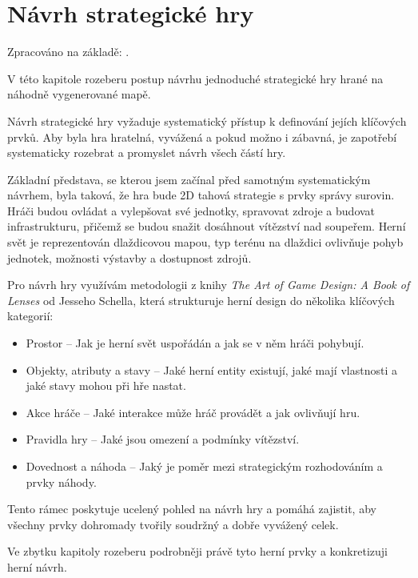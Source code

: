 \section{Návrh strategické hry}

Zpracováno na základě: \cite{navrh_lenses} \cite{navrh_rules} \cite{navrh_level}.

V této kapitole rozeberu postup návrhu jednoduché strategické hry hrané na náhodně vygenerované mapě.

Návrh strategické hry vyžaduje systematický přístup k definování jejích klíčových prvků. Aby byla hra hratelná, vyvážená a pokud možno i zábavná, je zapotřebí systematicky rozebrat a promyslet návrh všech částí hry. 

Základní představa, se kterou jsem začínal před samotným systematickým návrhem, byla taková, že hra bude 2D tahová strategie s prvky správy surovin. Hráči budou ovládat a vylepšovat své jednotky, spravovat zdroje a budovat infrastrukturu, přičemž se budou snažit dosáhnout vítězství nad soupeřem. Herní svět je reprezentován dlaždicovou mapou, typ terénu na dlaždici ovlivňuje pohyb jednotek, možnosti výstavby a dostupnost zdrojů.

Pro návrh hry využívám metodologii z knihy \textit{The Art of Game Design: A Book of Lenses} od Jesseho Schella, která strukturuje herní design do několika klíčových kategorií:

\begin{itemize}
    \item Prostor -- Jak je herní svět uspořádán a jak se v něm hráči pohybují.
    \item Objekty, atributy a stavy -- Jaké herní entity existují, jaké mají vlastnosti a jaké stavy mohou při hře nastat.
    \item Akce hráče -- Jaké interakce může hráč provádět a jak ovlivňují hru.
    \item Pravidla hry -- Jaké jsou omezení a podmínky vítězství.
    \item Dovednost a náhoda -- Jaký je poměr mezi strategickým rozhodováním a prvky náhody.
\end{itemize}

Tento rámec poskytuje ucelený pohled na návrh hry a pomáhá zajistit, aby všechny prvky dohromady tvořily soudržný a dobře vyvážený celek.

Ve zbytku kapitoly rozeberu podrobněji právě tyto herní prvky a konkretizuji herní návrh.

